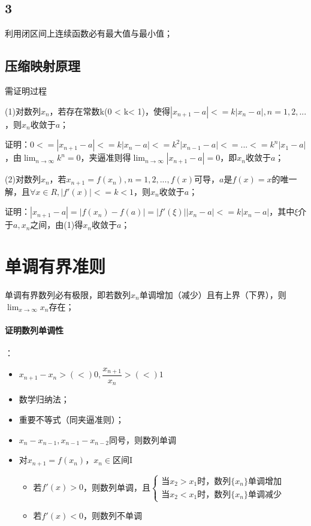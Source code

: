\subsection{3}
利用闭区间上连续函数必有最大值与最小值；

\subsection{压缩映射原理}
需证明过程

(1)对数列{\(x_n\)}，若存在常数k(0 < k< 1)，使得\(|x_{n + 1} - a| <= k|x_n - a|, n = 1, 2, ...\)，则{\(x_n\)}收敛于\(a\)；

证明：\(0 <= |x_{n + 1} - a| <= k|x_n - a| <= k^2|x_{n - 1} - a| <= ... <= k^n|x_1 - a|\)，由\(\displaystyle \lim_{n \to \infty}k^n = 0\)，夹逼准则得\(\displaystyle \lim_{n \to \infty}|x_{n + 1} - a| = 0\)，即{\(x_n\)}收敛于\(a\)；

(2)对数列{\(x_n\)}，若\(x_{n + 1} = f(x_n), n = 1, 2, ..., f(x)\)可导，\(a\)是\(f(x) = x\)的唯一解，且\(\forall x \in R, |f'(x)| <= k < 1\)，则{\(x_n\)}收敛于\(a\)；

证明：\(|x_{n + 1} - a| = |f(x_n) - f(a)| = |f'(\xi)||x_n - a| <= k|x_n - a|\)，其中\(\xi\)介于\(a, x_n\)之间，由(1)得{\(x_n\)}收敛于\(a\)；


\section{单调有界准则}
单调有界数列必有极限，即若数列{\(x_n\)}单调增加（减少）且有上界（下界），则\(\displaystyle \lim_{x \to \infty}x_n\)存在；

\paragraph{证明数列单调性}
：\begin{itemize}
    \item \(x_{n + 1} - x_n >(<) 0, \dfrac{x_{n + 1}}{x_n} >(<) 1\)
    \item 数学归纳法；
    \item 重要不等式（同夹逼准则）；
    \item \(x_n - x_{n - 1}, x_{n - 1} - x_{n - 2}\)同号，则数列单调
    \item 对\(x_{n + 1} = f(x_n)\)，\(x_n \in\)区间I\begin{itemize}
        \item 若\(f'(x) > 0\)，则数列单调，且\(\begin{cases}
        \text{当}x_2 > x_1\text{时，数列}\{x_n\}\text{单调增加} \\ 
        \text{当}x_2 < x_1\text{时，数列}\{x_n\}\text{单调减少}
        \end{cases}\)
        \item 若\(f'(x) < 0\)，则数列不单调
    \end{itemize}
\end{itemize}





